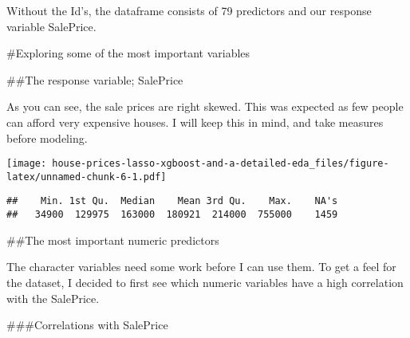 \documentclass[]{article}
\newenvironment{Shaded}{\begin{snugshade}}{\end{snugshade}}
\newcommand{\DataTypeTok}[1]{\textcolor[rgb]{0.13,0.29,0.53}{#1}}
\newcommand{\DecValTok}[1]{\textcolor[rgb]{0.00,0.00,0.81}{#1}}
\newcommand{\KeywordTok}[1]{\textcolor[rgb]{0.13,0.29,0.53}{\textbf{#1}}}
\newcommand{\NormalTok}[1]{#1}
\newcommand{\OperatorTok}[1]{\textcolor[rgb]{0.81,0.36,0.00}{\textbf{#1}}}
\newcommand{\StringTok}[1]{\textcolor[rgb]{0.31,0.60,0.02}{#1}}
\begin{document}
Without the Id's, the dataframe consists of 79 predictors and our
response variable SalePrice.

\#Exploring some of the most important variables

\#\#The response variable; SalePrice

As you can see, the sale prices are right skewed. This was expected as
few people can afford very expensive houses. I will keep this in mind,
and take measures before modeling.

\begin{Shaded}
\end{Shaded}

\texttt{[image: house-prices-lasso-xgboost-and-a-detailed-eda\_files/figure-latex/unnamed-chunk-6-1.pdf]}

\begin{Shaded}
\end{Shaded}

\begin{verbatim}
##    Min. 1st Qu.  Median    Mean 3rd Qu.    Max.    NA's 
##   34900  129975  163000  180921  214000  755000    1459
\end{verbatim}

\#\#The most important numeric predictors

The character variables need some work before I can use them. To get a
feel for the dataset, I decided to first see which numeric variables
have a high correlation with the SalePrice.

\#\#\#Correlations with SalePrice
\end{document}
